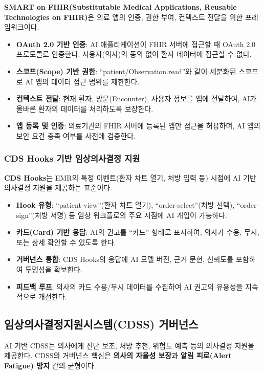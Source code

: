 \textbf{SMART on FHIR(Substitutable Medical Applications, Reusable Technologies on FHIR)}은 의료 앱의 인증, 권한 부여, 컨텍스트 전달을 위한 프레임워크이다.

\begin{itemize}
 \item \textbf{OAuth 2.0 기반 인증}: AI 애플리케이션이 FHIR 서버에 접근할 때 OAuth 2.0 프로토콜로 인증한다. 사용자(의사)의 동의 없이 환자 데이터에 접근할 수 없다.
 \item \textbf{스코프(Scope) 기반 권한}: ``patient/Observation.read''와 같이 세분화된 스코프로 AI 앱의 데이터 접근 범위를 제한한다.
 \item \textbf{컨텍스트 전달}: 현재 환자, 방문(Encounter), 사용자 정보를 앱에 전달하여, AI가 올바른 환자의 데이터를 처리하도록 보장한다.
 \item \textbf{앱 등록 및 인증}: 의료기관의 FHIR 서버에 등록된 앱만 접근을 허용하며, AI 앱의 보안 요건 충족 여부를 사전에 검증한다.
\end{itemize}

\subsubsection{CDS Hooks 기반 임상의사결정 지원}

\textbf{CDS Hooks}는 EMR의 특정 이벤트(환자 차트 열기, 처방 입력 등) 시점에 AI 기반 의사결정 지원을 제공하는 표준이다.

\begin{itemize}
 \item \textbf{Hook 유형}: ``patient-view''(환자 차트 열기), ``order-select''(처방 선택), ``order-sign''(처방 서명) 등 임상 워크플로의 주요 시점에 AI 개입이 가능하다.
 \item \textbf{카드(Card) 기반 응답}: AI의 권고를 ``카드'' 형태로 표시하여, 의사가 수용, 무시, 또는 상세 확인할 수 있도록 한다.
 \item \textbf{거버넌스 통합}: CDS Hooks의 응답에 AI 모델 버전, 근거 문헌, 신뢰도를 포함하여 투명성을 확보한다.
 \item \textbf{피드백 루프}: 의사의 카드 수용/무시 데이터를 수집하여 AI 권고의 유용성을 지속적으로 개선한다.
\end{itemize}

\subsection{임상의사결정지원시스템(CDSS) 거버넌스}
\label{sec:16.4.2}

AI 기반 CDSS는 의사에게 진단 보조, 처방 추천, 위험도 예측 등의 의사결정 지원을 제공한다. CDSS의 거버넌스 핵심은 \textbf{의사의 자율성 보장}과 \textbf{알림 피로(Alert Fatigue) 방지} 간의 균형이다.

